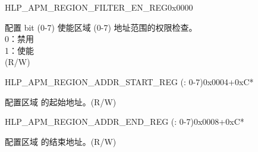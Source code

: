 \begin{register}{H}{LP\_APM\_REGION\_FILTER\_EN\_REG}{0x0000}\label{regdesc:LPAPMREGIONFILTERENREG}
%
%
\regnewline%
\begin{regdesc}\begin{reglist}
\label{fielddesc:LPAPMREGIONFILTEREN}\item [LP\_APM\_REGION\_FILTER\_EN] 配置 bit  (0-7) 使能区域  (0-7) 地址范围的权限检查。\\
0：禁用 \\
1：使能  \\ (R/W)
\end{reglist}\end{regdesc}
\end{register}


\begin{register}{H}{LP\_APM\_REGION\_ADDR\_START\_REG (: 0-7)}{0x0004+0xC*}\label{regdesc:LPAPMREGIONNADDRSTARTREG}
%
\regnewline%
\begin{regdesc}\begin{reglist}
\label{fielddesc:LPAPMREGIONNADDRSTART}\item [LP\_APM\_REGION\regindex{n}\_ADDR\_START] 配置区域  的起始地址。(R/W)
\end{reglist}\end{regdesc}
\end{register}


\begin{register}{H}{LP\_APM\_REGION\_ADDR\_END\_REG (: 0-7)}{0x0008+0xC*}\label{regdesc:LPAPMREGIONNADDRENDREG}
%
\regnewline%
\begin{regdesc}\begin{reglist}
\label{fielddesc:LPAPMREGIONNADDREND}\item [LP\_APM\_REGION\regindex{n}\_ADDR\_END] 配置区域  的结束地址。(R/W)
\end{reglist}\end{regdesc}
\end{register}


